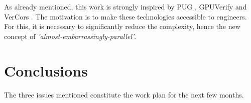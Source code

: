 \documentclass[a4paper,10pt]{article} %
\begin{document}
As already mentioned, this work is strongly inspired by PUG \cite{li2010scalable}, GPUVerify \cite{betts2012gpuverify} and VerCors \cite{blom2014vercors}.
The motivation is to make these technologies accessible to engineers.
For this, it is necessary to significantly reduce the complexity, hence the new concept of \emph{'almost-embarrassingly-parallel'}.


\begin{comment}

Two common ways to do so are sequential consistency
\cite{lamport1979make} and linearizability \cite{herlihy1990linearizability}. Both require that
the values returned by the operations appear to have
been returned by a sequential execution of the same
operations; sequential consistency only requires this
order to be consistent with the order in which each
individual thread invokes the operations, while linearizability
further requires this order to be consistent
with the real-time order of nonoverlapping operations.

This concept of \emph{'almost-embarrassingly-parallel'} kernel has to be validated.

\end{comment}

\section{Conclusions}

The three issues mentioned constitute the work plan for the next few months.




\end{document}
